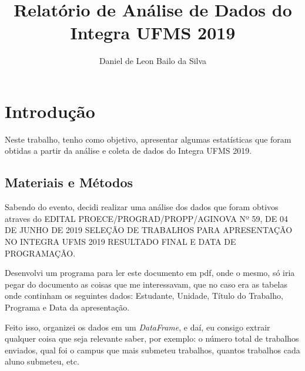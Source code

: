 \documentclass[a4paper, 12pt]{article}
\title{Relatório de Análise de Dados do Integra UFMS 2019}
\author{Daniel de Leon Bailo da Silva}
\begin{document}
\maketitle

\section{Introdução}\label{sec:introducao}
Neste trabalho, tenho como objetivo, apresentar algumas estatísticas que foram obtidas a partir da análise e coleta de dados do Integra UFMS 2019.
\subsection{Materiais e Métodos}
Sabendo do evento, decidi realizar uma análise dos dados que foram obtivos atraves do EDITAL PROECE/PROGRAD/PROPP/AGINOVA Nº 59, DE 04 DE JUNHO DE 2019 SELEÇÃO DE TRABALHOS PARA APRESENTAÇÃO NO INTEGRA UFMS 2019 RESULTADO FINAL E DATA DE PROGRAMAÇÃO.

Desenvolvi um programa para ler este documento em pdf, onde o mesmo, só iria pegar do documento as coisas que me interessavam, que no caso era as tabelas onde continham os seguintes dados: Estudante, Unidade, Título do Trabalho, Programa e Data da apresentação.

Feito isso, organizei os dados em um {\it DataFrame}, e daí, eu consigo extrair qualquer coisa que seja relevante saber, por exemplo: o número total de trabalhos enviados, qual foi o campus que mais submeteu trabalhos, quantos trabalhos cada aluno submeteu, etc.

\newpage
\end{document}
